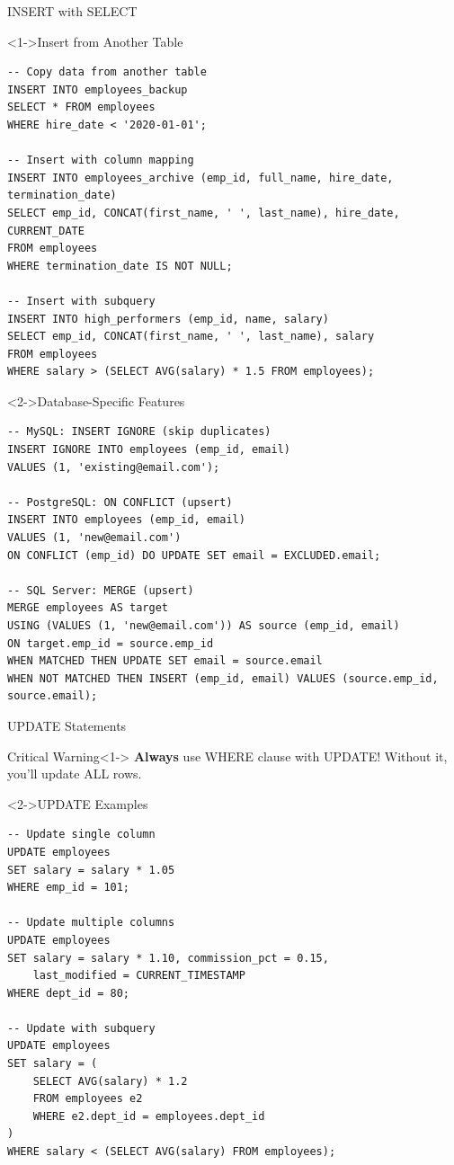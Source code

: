 \documentclass[aspectratio=169,11pt]{beamer}
\begin{document}
\begin{frame}[fragile]{INSERT with SELECT}
\begin{exampleblock}<1->{Insert from Another Table}
\begin{lstlisting}
-- Copy data from another table
INSERT INTO employees_backup
SELECT * FROM employees
WHERE hire_date < '2020-01-01';

-- Insert with column mapping
INSERT INTO employees_archive (emp_id, full_name, hire_date, termination_date)
SELECT emp_id, CONCAT(first_name, ' ', last_name), hire_date, CURRENT_DATE
FROM employees
WHERE termination_date IS NOT NULL;

-- Insert with subquery
INSERT INTO high_performers (emp_id, name, salary)
SELECT emp_id, CONCAT(first_name, ' ', last_name), salary
FROM employees
WHERE salary > (SELECT AVG(salary) * 1.5 FROM employees);
\end{lstlisting}
\end{exampleblock}

\pause
\begin{exampleblock}<2->{Database-Specific Features}
\begin{lstlisting}
-- MySQL: INSERT IGNORE (skip duplicates)
INSERT IGNORE INTO employees (emp_id, email)
VALUES (1, 'existing@email.com');

-- PostgreSQL: ON CONFLICT (upsert)
INSERT INTO employees (emp_id, email)
VALUES (1, 'new@email.com')
ON CONFLICT (emp_id) DO UPDATE SET email = EXCLUDED.email;

-- SQL Server: MERGE (upsert)
MERGE employees AS target
USING (VALUES (1, 'new@email.com')) AS source (emp_id, email)
ON target.emp_id = source.emp_id
WHEN MATCHED THEN UPDATE SET email = source.email
WHEN NOT MATCHED THEN INSERT (emp_id, email) VALUES (source.emp_id, source.email);
\end{lstlisting}
\end{exampleblock}
\end{frame}

\begin{frame}[fragile]{UPDATE Statements}
\begin{alertblock}{\textcolor{red}{} Critical Warning}<1->
\textbf{Always} use WHERE clause with UPDATE! Without it, you'll update ALL rows.
\end{alertblock}

\pause
\begin{exampleblock}<2->{UPDATE Examples}
\begin{lstlisting}
-- Update single column
UPDATE employees
SET salary = salary * 1.05
WHERE emp_id = 101;

-- Update multiple columns
UPDATE employees
SET salary = salary * 1.10, commission_pct = 0.15,
    last_modified = CURRENT_TIMESTAMP
WHERE dept_id = 80;

-- Update with subquery
UPDATE employees
SET salary = (
    SELECT AVG(salary) * 1.2
    FROM employees e2
    WHERE e2.dept_id = employees.dept_id
)
WHERE salary < (SELECT AVG(salary) FROM employees);
\end{lstlisting}
\end{exampleblock}
\end{frame}
\end{document}
